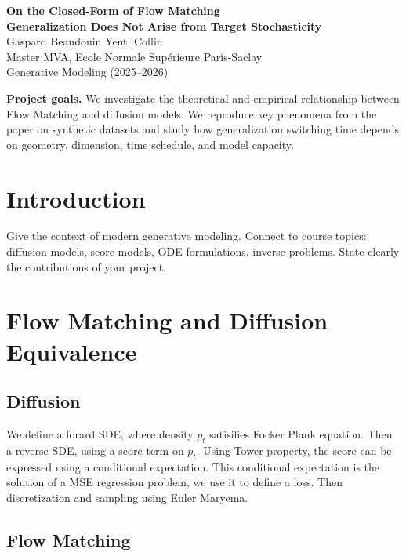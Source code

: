 \documentclass[10pt,a4paper]{article}
\theoremstyle{definition}
\begin{document}
\begin{center}
    {\LARGE\bfseries\color{TitleColor}
    On the Closed-Form of Flow Matching}\\[0.25em]
    {\large\bfseries\color{TitleColor}
    Generalization Does Not Arise from Target Stochasticity}\\[0.9em]

    {\large Gaspard Beaudouin \hspace{1cm} Yentl Collin}\\[0.25em]
    {\normalsize Master MVA, Ecole Normale Supérieure Paris-Saclay}\\[0.25em]
    {\normalsize Generative Modeling (2025--2026)}
\end{center}

\vspace{0.5em}

\begin{highlightbox}
\textbf{Project goals.}
We investigate the theoretical and empirical relationship between Flow Matching and diffusion models. We reproduce key phenomena from the paper on synthetic datasets and study how generalization switching time depends on geometry, dimension, time schedule, and model capacity.
\end{highlightbox}

\section{Introduction}
Give the context of modern generative modeling.
Connect to course topics: diffusion models, score models, ODE formulations, inverse problems.
State clearly the contributions of your project.

\section{Flow Matching and Diffusion Equivalence}
\subsection{Diffusion}
We define a forard SDE, where density $p_t$ satisifies Focker Plank equation.
Then a reverse SDE, using a score term on $p_t$.
Using Tower property, the score can be expressed using a conditional expectation. This conditional expectation is the solution of a MSE regression problem, we use it to define a loss.
Then discretization and sampling using Euler Maryema.


\subsection{Flow Matching}
\end{document}
